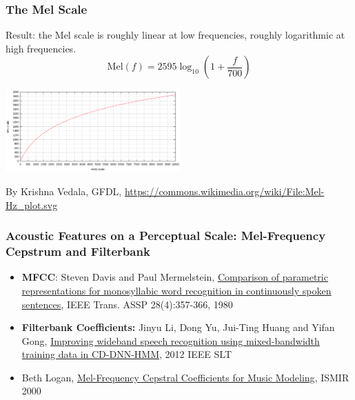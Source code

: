 \documentclass{beamer}
\begin{document}
\begin{frame}
  \frametitle{The Mel Scale}

  Result: the Mel scale is roughly linear at low frequencies, roughly
  logarithmic at high frequencies.
  \[
  \mbox{Mel}(f) = 2595\log_{10}\left(1+\frac{f}{700}\right)
  \]
  \centerline{\includegraphics[height=1.25in]{Mel-Hz_plot.png}}
  \begin{tiny}
    By Krishna Vedala, GFDL,
    \url{https://commons.wikimedia.org/wiki/File:Mel-Hz_plot.svg}
  \end{tiny}
\end{frame}

\begin{frame}
  \frametitle{Acoustic Features on a Perceptual Scale: Mel-Frequency Cepstrum and Filterbank}
  \begin{itemize}
  \item {\bf MFCC}: Steven Davis and Paul Mermelstein,
    \href{https://ieeexplore.ieee.org/document/1163420}{\underline{Comparison of parametric representations} \underline{for monosyllabic word recognition in continuously spoken sentences}},
    IEEE Trans. ASSP 28(4):357-366, 1980
  \item {\bf Filterbank Coefficients:} Jinyu Li, Dong Yu, Jui-Ting Huang and Yifan Gong,
    \href{https://ieeexplore.ieee.org/abstract/document/6424210?casa_token=Ad3Ih5CvZIYAAAAA:5_LoLH71R6lGjlwiyUP54EI9dykCpk3hlPknh7ZdNGxMtKm_c1u13qIRGVa0WUnZlRj0f-9F}{Improving wideband speech recognition using mixed-bandwidth training data in CD-DNN-HMM}, 2012 IEEE SLT
  \item Beth Logan,
    \href{http://citeseerx.ist.psu.edu/viewdoc/download?doi=10.1.1.11.9216&rep=rep1&type=pdf}{\underline{Mel-Frequency Cepstral Coefficients for Music Modeling}}, ISMIR 2000
  \end{itemize}
\end{frame}
\end{document}

